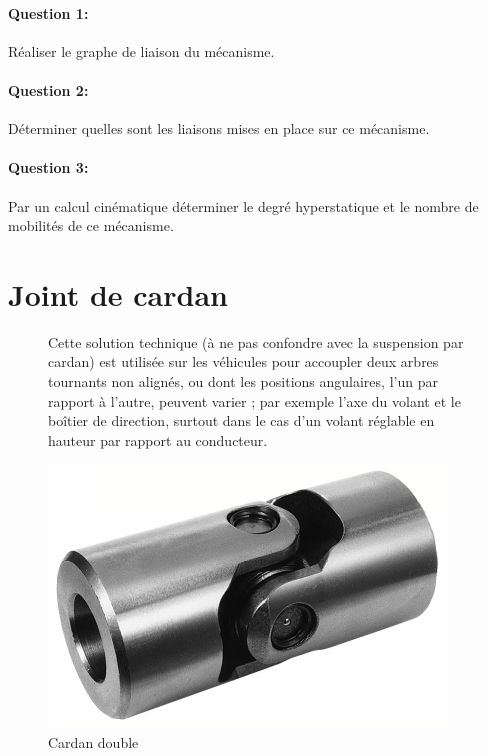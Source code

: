 \paragraph{Question 1:}

Réaliser le graphe de liaison du mécanisme.

\paragraph{Question 2:}

Déterminer quelles sont les liaisons mises en place sur ce mécanisme.

\paragraph{Question 3:}

Par un calcul cinématique déterminer le degré hyperstatique et le nombre de mobilités de ce mécanisme.

\cleardoublepage

\section{Joint de cardan}

\begin{figure}[htbp]
\begin{minipage}[c]{.55\linewidth}
Cette solution technique (à ne pas confondre avec la suspension par cardan) est utilisée sur les véhicules pour accoupler deux arbres tournants non alignés, ou dont les positions angulaires, l'un par rapport à l'autre, peuvent varier ; par exemple l'axe du volant et le boîtier de direction, surtout dans le cas d'un volant réglable en hauteur par rapport au conducteur.
\end{minipage}
\hfill
\begin{minipage}[c]{.4\linewidth}
\begin{center}
\includegraphics[width=0.7\linewidth]{img/cardan-double.jpg}
\caption{Cardan double}
\label{fig:image7}
\end{center}
\end{minipage}
\end{figure}

